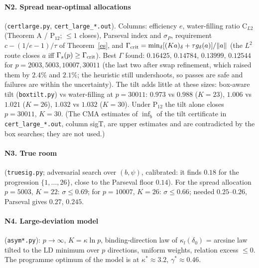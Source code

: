\paragraph{N2. Spread near-optimal allocations} (\texttt{certlarge.py}, \texttt{cert\_large\_*.out}).  Columns: efficiency $e$, water-filling ratio
$\mathrm{C}_{L2}$ (Theorem A / P$_{12}$; $\le1$ closes), Parseval index and $\sigma_P$, requirement $c-(1/e-1)/\tau$ of Theorem~\ref{es}, and
$\Gamma_{\rm crit}=\min_\delta[(Ka)_\delta+\tau g_\delta(a)]/\|a\|$ (the $L^2$ route closes $a$ iff $\Gamma_s(p)\ge\Gamma_{\rm crit}$).  Best $\Gamma$ found: $0.16425$, $0.14784$,
$0.13999$, $0.12544$ for $p=2003,5003,10007,30011$ (the last two after swap refinement, which raised them by $2.4\%$ and $2.1\%$; the
heuristic still undershoots, so passes are safe and failures are within the uncertainty).  The tilt adds little at these sizes: box-aware tilt
(\texttt{boxtilt.py}) vs water-filling at $p=30011$: $0.973$ vs $0.988$ ($K=23$), $1.006$ vs $1.021$ ($K=26$), $1.032$ vs $1.032$ ($K=30$).  Under P$_{12}$ the tilt alone closes $p=30011$, $K=30$.
(The CMA estimates of $\inf_b$ of the tilt certificate in \texttt{cert\_large\_*.out}, column sigT, are upper estimates and are contradicted by the
box searches; they are not used.)


\paragraph{N3. True room} (\texttt{truesig.py}; adversarial search over $(b,\psi)$, calibrated: it finds $0.18$ for the progression $\{1,\dots,26\}$, close
to the Parseval floor $0.14$).  For the spread allocation $p=5003$, $K=22$: $\sigma\le0.69$; for $p=10007$, $K=26$: $\sigma\le0.66$; needed $0.25$--$0.26$, Parseval
gives $0.27$, $0.245$.

\paragraph{N4. Large-deviation model} (\texttt{asym*.py}): $p\to\infty$, $K=\kappa\ln p$, binding-direction law of $\kappa_l(\delta_0)$ = arcsine law tilted to the LD
minimum over $p$ directions, uniform weights, relation excess $\le0$.  The programme optimum of the model is at $\kappa^\ast\approx3.2$, $\gamma^\ast\approx0.46$.

